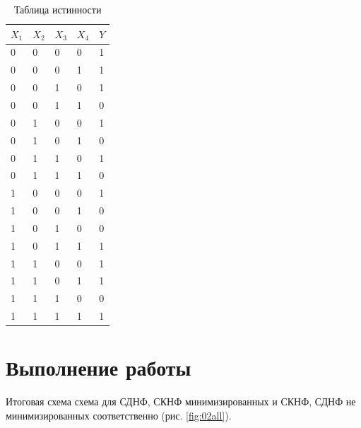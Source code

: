 \documentclass[a4paper,14pt]{article}
\begin{document}
\begin{table}[H]
	\caption{Таблица истинности}
	
	\begin{center}
	\begin{tabular}{|l|l|l|l|l|}
		
		\hline
		$X_1$ & $X_2$ & $X_3$ & $X_4$ & $Y$ \\ \hline
		0 & 0 & 0 & 0 & 1 \\ \hline
		0 & 0 & 0 & 1 & 1 \\ \hline
		0 & 0 & 1 & 0 & 1 \\ \hline
		0 & 0 & 1 & 1 & 0 \\ \hline
		0 & 1 & 0 & 0 & 1 \\ \hline
		0 & 1 & 0 & 1 & 0 \\ \hline
		0 & 1 & 1 & 0 & 1 \\ \hline
		0 & 1 & 1 & 1 & 0 \\ \hline
		1 & 0 & 0 & 0 & 1 \\ \hline
		1 & 0 & 0 & 1 & 0 \\ \hline
		1 & 0 & 1 & 0 & 0 \\ \hline
		1 & 0 & 1 & 1 & 1 \\ \hline
		1 & 1 & 0 & 0 & 1 \\ \hline
		1 & 1 & 0 & 1 & 1 \\ \hline
		1 & 1 & 1 & 0 & 0 \\ \hline
		1 & 1 & 1 & 1 & 1 \\ \hline
	\end{tabular}
\end{center}
\end{table}

\section{Выполнение работы}

Итоговая схема схема для СДНФ, СКНФ минимизированных и СКНФ, СДНФ не минимизированных соответственно (рис. \ref{fig:02all}).
\end{document}
